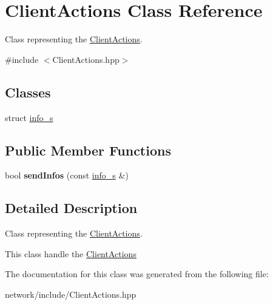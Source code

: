 \hypertarget{class_client_actions}{}\section{Client\+Actions Class Reference}
\label{class_client_actions}


Class representing the \hyperlink{class_client_actions}{Client\+Actions}.  




{\ttfamily \#include $<$Client\+Actions.\+hpp$>$}

\subsection*{Classes}
\begin{DoxyCompactItemize}
\item 
struct \hyperlink{struct_client_actions_1_1info__s}{info\+\_\+s}
\end{DoxyCompactItemize}
\subsection*{Public Member Functions}
\begin{DoxyCompactItemize}
\item 
\mbox{\label{class_client_actions_a81f8aa1801522eb7ee650cd1b4a1fb73}} 
bool {\bfseries send\+Infos} (const \hyperlink{struct_client_actions_1_1info__s}{info\+\_\+s} \&)
\end{DoxyCompactItemize}


\subsection{Detailed Description}
Class representing the \hyperlink{class_client_actions}{Client\+Actions}. 

This class handle the \hyperlink{class_client_actions}{Client\+Actions} 

The documentation for this class was generated from the following file\+:\begin{DoxyCompactItemize}
\item 
network/include/Client\+Actions.\+hpp\end{DoxyCompactItemize}
